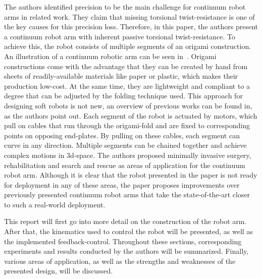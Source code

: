 The authors identified precision to be the main challenge for continuum robot arms in related work\cite{santoso_origami_2021}.
They claim that missing torsional twist-resistance is one of the key causes for this precision loss.
Therefore, in this paper\cite{santoso_origami_2021}, the authors present a continuum robot arm with inherent passive torsional twist-resistance.
To achieve this, the robot consists of multiple segments of an origami construction.
An illustration of a continuum robotic arm can be seen in\ .
Origami constructions come with the advantage that they can be created by hand from sheets of readily-available materials like paper or plastic, which makes their production low-cost.
At the same time, they are lightweight and compliant to a degree that can be adjusted by the folding technique used.
This approach for designing soft robots is not new, an overview of previous works can be found in\cite{rus_design_2018}, as the authors point out\cite{santoso_origami_2021}.
Each segment of the robot is actuated by motors, which pull on cables that run through the origami-fold and are fixed to corresponding points on opposing end-plates.
By pulling on these cables, each segment can curve in any direction.
Multiple segments can be chained together and achieve complex motions in 3d-space.
The authors proposed minimally invasive surgery\cite{cianchetti_soft_2014}, rehabilitation\cite{polygerinos_soft_2015} and search and rescue\cite{tolley_resilient_2014} as areas of application for the continuum robot arm\cite{santoso_origami_2021}.
Although it is clear that the robot presented in the paper is not ready for deployment in any of these areas, the paper proposes improvements over previously presented continuum robot arms that take the state-of-the-art closer to such a real-world deployment.

This report will first go into more detail on the construction of the robot arm.
After that, the kinematics used to control the robot will be presented, as well as the implemented feedback-control.
Throughout these sections, corresponding experiments and results conducted by the authors will be summarized.
Finally, various areas of application, as well as the strengths and weaknesses of the presented design, will be discussed.
